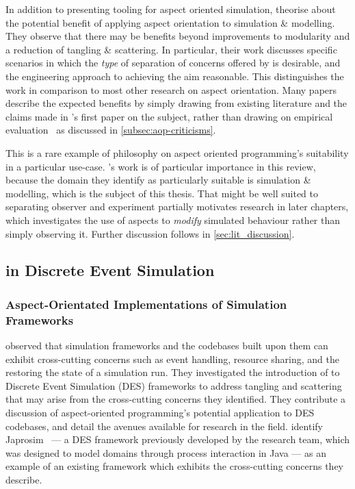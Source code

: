 In addition to presenting tooling for aspect oriented simulation,
\citet{gulyas1999use} theorise about the potential benefit of applying aspect
orientation to simulation \& modelling. They observe that there may be benefits
beyond improvements to modularity and a reduction of tangling \& scattering. In
particular, their work discusses specific scenarios in which the \emph{type} of
separation of concerns offered by \aspectorientation{} is desirable, and the
engineering approach to achieving the aim reasonable.
This distinguishes the work in comparison to most other research on aspect
orientation. Many papers describe the expected benefits by simply drawing from
existing literature and the claims made in \citet{kiczales1997aspect}'s first
paper on the subject, rather than drawing on empirical
evaluation~\cite{steimann06paradoxical,przybylek2010wrong,przybylek2018empirical}
as discussed in \cref{subsec:aop-criticisms}.

This is a rare example of philosophy on aspect oriented programming's
suitability in a particular use-case. \citeauthor{gulyas1999use}'s work is of
particular importance in this review, because the domain they identify as
particularly suitable is simulation \& modelling, which is the subject of this
thesis. That \aspectorientation{} might be well suited to separating observer and
experiment partially motivates research in later chapters, which investigates
the use of aspects to \emph{modify} simulated behaviour rather than simply
observing it. Further discussion follows in \cref{sec:lit_discussion}.



\subsection{\AspectOrientation{} in Discrete Event Simulation}

\subsubsection{Aspect-Orientated Implementations of Simulation Frameworks}

\citet{chibani2013toward} observed that simulation frameworks and the codebases
built upon them can exhibit cross-cutting concerns such as event handling,
resource sharing, and the restoring the state of a simulation run. They
investigated the introduction of \aspectorientation{} to Discrete Event Simulation
(DES) frameworks to address tangling and scattering that may arise from the
cross-cutting concerns they identified. They contribute a discussion of
aspect-oriented programming's potential application to DES codebases, and detail
the avenues available for research in the field. \citet{chibani2013toward}
identify Japrosim~\cite{abdelhabib2008japrosim,belattar2014yet} --- a DES
framework previously developed by the research team, which was designed to model
domains through process interaction in Java --- as an example of an
existing framework which exhibits the cross-cutting concerns they describe.

